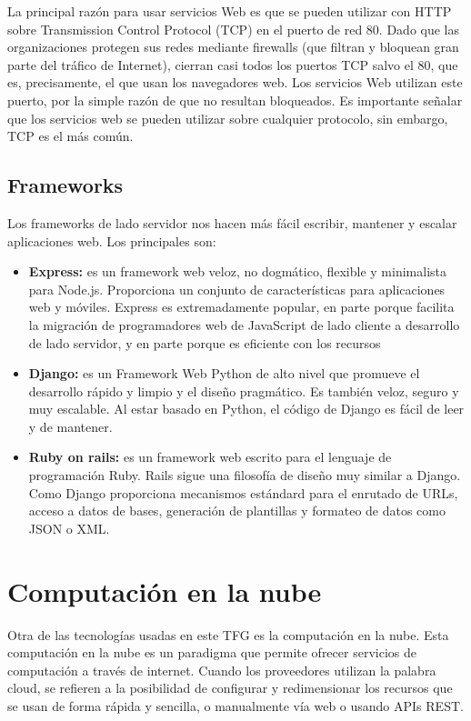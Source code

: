 La principal razón para usar servicios Web es que se pueden utilizar con HTTP sobre Transmission Control Protocol (TCP) en el puerto de red 80. Dado que las organizaciones protegen sus redes mediante firewalls (que filtran y bloquean gran parte del tráfico de Internet), cierran casi todos los puertos TCP salvo el 80, que es, precisamente, el que usan los navegadores web. Los servicios Web utilizan este puerto, por la simple razón de que no resultan bloqueados. Es importante señalar que los servicios web se pueden utilizar sobre cualquier protocolo, sin embargo, TCP es el más común.

\subsection*{Frameworks}
Los frameworks de lado servidor nos hacen más fácil escribir, mantener y escalar aplicaciones web. Los principales son:
\begin{itemize}
    \item \textbf{Express: } es un framework web veloz, no dogmático, flexible y minimalista para Node.js. Proporciona un conjunto de características para aplicaciones web y móviles. Express es extremadamente popular, en parte porque facilita la migración de programadores web de JavaScript de lado cliente a desarrollo de lado servidor, y en parte porque es eficiente con los recursos
    \item \textbf{Django: } es un Framework Web Python de alto nivel que promueve el desarrollo rápido y limpio y el diseño pragmático. Es también veloz, seguro y muy escalable. Al estar basado en Python, el código de Django es fácil de leer y de mantener.
    \item \textbf{Ruby on rails: } es un framework web escrito para el lenguaje de programación Ruby. Rails sigue una filosofía de diseño muy similar a Django. Como Django proporciona mecanismos estándard para el enrutado de URLs, acceso a datos de bases, generación de plantillas y formateo de datos como JSON o XML.
\end{itemize}

\section{Computación en la nube}
Otra de las tecnologías usadas en este TFG es la computación en la nube. Esta computación en la nube es un paradigma que permite ofrecer servicios de computación a través de internet. Cuando los proveedores utilizan la palabra cloud, se refieren a la posibilidad de configurar y redimensionar los recursos que se usan de forma rápida y sencilla, o manualmente vía web o usando APIs REST.

